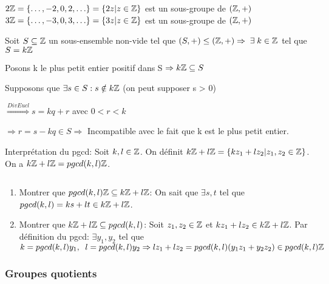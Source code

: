 \begin{exmp}
$2\mathbb{Z} = \{ \ldots, -2, 0, 2, \ldots \} = \{ 2z | z \in \mathbb{Z} \}$ est un sous-groupe de $(\mathbb{Z},+)$\\

\hspace{-0.5cm}$3\mathbb{Z} = \{ \ldots, -3, 0, 3, \ldots \} = \{ 3z | z \in \mathbb{Z} \}$ est un sous-groupe de $(\mathbb{Z},+)$
\end{exmp}

\begin{prop}
Soit $S \subseteq \mathbb{Z}$ un sous-ensemble non-vide tel que $(S,+) \leq (\mathbb{Z},+) \Rightarrow \; \exists \; k \in \mathbb{Z}$ tel que $S = k\mathbb{Z}$
\end{prop}

\begin{demo}
Posons k le plus petit entier positif dans S $\Rightarrow k\mathbb{Z} \subseteq S$

\hspace{-0.5cm}Supposons que $\exists s \in S: s \notin k\mathbb{Z}$ (on peut supposer s > 0)

\hspace{-0.5cm}$\overset{Div Eucl}{\Rightarrow} s=kq + r$ avec $0 < r < k$

\hspace{-0.5cm}$\Rightarrow r = s-kq \in S \Rightarrow$ Incompatible avec le fait que k est le plus petit entier.
\end{demo}

\begin{exmp}
Interprétation du pgcd: Soit $k, l \in \mathbb{Z}$. On définit $k\mathbb{Z} + l\mathbb{Z} = \{ kz_1 + lz_2 | z_1, z_2 \in \mathbb{Z} \}$. On a $k\mathbb{Z} + l\mathbb{Z} = pgcd(k,l)\mathbb{Z}$.
\end{exmp}

\begin{demo} $\;$
\begin{enumerate}[1)]
	\item Montrer que $pgcd(k,l)\mathbb{Z} \subseteq k\mathbb{Z} + l\mathbb{Z}$: On sait que $\exists s,t$ tel que $pgcd(k,l) = ks + lt \in k\mathbb{Z} + l\mathbb{Z}$.
	\item Montrer que $k\mathbb{Z} + l\mathbb{Z} \subseteq pgcd(k,l)$: Soit $z_1,z_2 \in \mathbb{Z}$ et $kz_1 + lz_2 \in k\mathbb{Z} + l\mathbb{Z}$. Par définition du pgcd: $\exists y_1,y_2$ tel que $k=pgcd(k,l)y_1, \;\; l=pgcd(k,l)y_2 \Rightarrow lz_1 + lz_2 = pgcd(k,l)(y_1 z_1 + y_2 z_2) \in pgcd(k,l)\mathbb{Z}$ 
\end{enumerate}
\end{demo}

\subsubsection{Groupes quotients}

